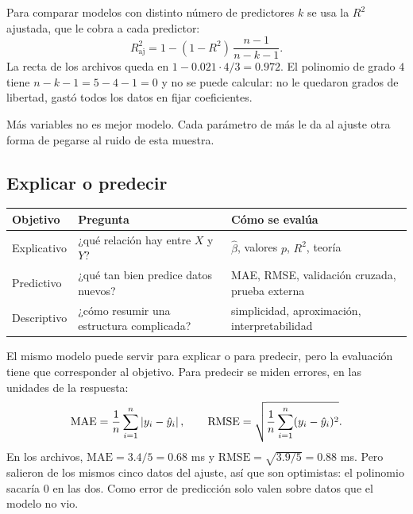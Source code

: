 \documentclass[11pt,letterpaper]{article}
\begin{document}
Para comparar modelos con distinto número de predictores $k$ se usa la
$R^2$ ajustada, que le cobra a cada predictor:
\[
    R^2_{\text{aj}} = 1 - (1 - R^2)\, \frac{n - 1}{n - k - 1} .
\]
La recta de los archivos queda en $1 - 0.021 \cdot 4/3 = 0.972$. El
polinomio de grado $4$ tiene $n - k - 1 = 5 - 4 - 1 = 0$ y no se puede
calcular: no le quedaron grados de libertad, gastó todos los datos en
fijar coeficientes.

\begin{idea}
    Más variables no es mejor modelo. Cada parámetro de más le da al
    ajuste otra forma de pegarse al ruido de esta muestra.
\end{idea}


\subsection*{Explicar o predecir}

\begin{center}
\small
\begin{tabular}{l>{\raggedright\arraybackslash}p{5cm}%
                 >{\raggedright\arraybackslash}p{5.4cm}}
    \toprule
    \textbf{Objetivo} & \textbf{Pregunta} & \textbf{Cómo se evalúa} \\
    \midrule
    Explicativo & ¿qué relación hay entre $X$ y $Y$?
                & $\hat{\beta}$, valores $p$, $R^2$, teoría \\
    \addlinespace
    Predictivo & ¿qué tan bien predice datos nuevos?
               & MAE, RMSE, validación cruzada, prueba externa \\
    \addlinespace
    Descriptivo & ¿cómo resumir una estructura complicada?
                & simplicidad, aproximación, interpretabilidad \\
    \bottomrule
\end{tabular}
\end{center}

El mismo modelo puede servir para explicar o para predecir, pero la
evaluación tiene que corresponder al objetivo. Para predecir se miden
errores, en las unidades de la respuesta:
\[
    \mathrm{MAE} = \frac{1}{n} \sum_{i=1}^{n} \left\lvert y_i - \hat{y}_i \right\rvert ,
    \qquad
    \mathrm{RMSE} = \sqrt{\frac{1}{n} \sum_{i=1}^{n}
                    (y_i - \hat{y}_i)^2} .
\]
En los archivos, $\mathrm{MAE} = 3.4 / 5 = 0.68$ ms y
$\mathrm{RMSE} = \sqrt{3.9 / 5} = 0.88$ ms. Pero salieron de los mismos
cinco datos del ajuste, así que son optimistas: el polinomio sacaría
$0$ en las dos. Como error de predicción solo valen sobre datos que el
modelo no vio.
\end{document}
